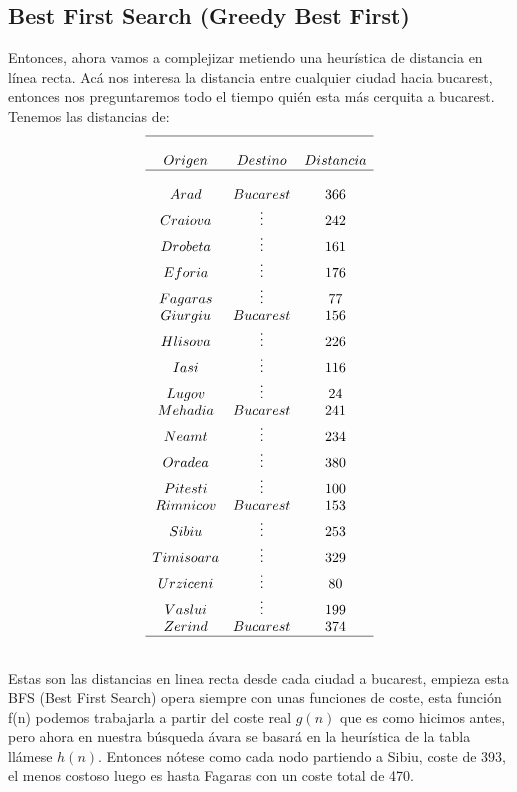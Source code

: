 \subsection{Best First Search (Greedy Best First)}
Entonces, ahora vamos a complejizar metiendo una heurística de distancia en línea recta. Acá nos interesa la distancia entre cualquier ciudad hacia bucarest, entonces nos preguntaremos todo el tiempo quién esta más cerquita a bucarest. Tenemos las distancias de:
$$
	\begin{array}{ccc}
		\hline                           \\
		Origen    & Destino  & Distancia \\
		\hline                           \\
		Arad      & Bucarest & 366       \\
		Craiova   & \vdots   & 242       \\
		Drobeta   & \vdots   & 161       \\
		Eforia    & \vdots   & 176       \\
		Fagaras   & \vdots   & 77        \\
		Giurgiu   & Bucarest & 156       \\
		Hlisova   & \vdots   & 226       \\
		Iasi      & \vdots   & 116       \\
		Lugov     & \vdots   & 24        \\
		Mehadia   & Bucarest & 241       \\
		Neamt     & \vdots   & 234       \\
		Oradea    & \vdots   & 380       \\
		Pitesti   & \vdots   & 100       \\
		Rimnicov  & Bucarest & 153       \\
		Sibiu     & \vdots   & 253       \\
		Timisoara & \vdots   & 329       \\
		Urziceni  & \vdots   & 80        \\
		Vaslui    & \vdots   & 199       \\
		Zerind    & Bucarest & 374       \\
		\hline                           \\
	\end{array}
$$

Estas son las distancias en linea recta desde cada ciudad a bucarest, empieza esta BFS (Best First Search) opera siempre con unas funciones de coste, esta función f(n) podemos trabajarla a partir del coste real $g(n)$ que es como hicimos antes, pero ahora en nuestra búsqueda ávara se basará en la heurística de la tabla llámese $h(n)$.
Entonces nótese como cada nodo partiendo a Sibiu, coste de 393, el menos costoso luego es hasta Fagaras con un coste total de 470.

